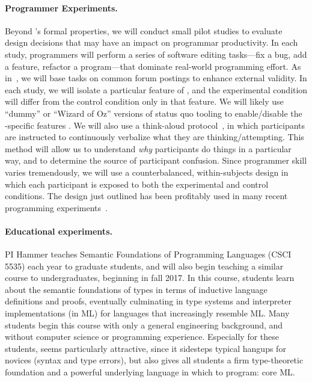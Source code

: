\paragraph{Programmer Experiments.} 
%
Beyond \Hazel's formal properties, we will conduct small pilot studies to
evaluate design decisions that may have an impact on programmar productivity. 
%
In each study, programmers will perform a series of software editing 
tasks---fix a bug, add a feature, refactor a program---that dominate 
real-world programming effort. As in~\cite{sunshine14plaiddoc}, 
we will base tasks on common forum postings to enhance external validity. In 
each study, we will isolate a particular feature of \Hazel, and the experimental 
condition will differ from the control condition only in that feature. We will 
likely use ``dummy'' or ``Wizard of Oz''  versions of status quo tooling to 
enable/disable the \HazelEnv-specific features \cite{wizard-of-oz}. We will also use 
a think-aloud protocol~\cite{think-aloud-protocol}, in which participants are 
instructed to continuously verbalize what they are thinking/attempting. This 
method will allow us to understand \textit{why} participants do things in a 
particular way, and to determine the source of participant confusion. Since 
programmer skill varies tremendously, we will use a counterbalanced, 
within-subjects design in which each participant is exposed to both the 
experimental and control conditions. 
The design just outlined has been profitably used in many recent programming 
experiments~\cite{stylos-constructor-params, static-typing-apidoc, benefits-generic-types}.



\paragraph{Educational experiments.} 
%
PI Hammer teaches Semantic Foundations of Programming Languages (CSCI
5535) each year to graduate students, and will also begin teaching a
similar course to undergraduates, beginning in fall 2017.
%
In this course, students learn about the semantic foundations of types
in terms of inductive language definitions and proofs, eventually
culminating in type systems and interpreter implementations (in ML)
for languages that increasingly resemble ML.
%
Many students begin this course with only a general engineering
background, and without computer science or programming experience.
Especially for these students, \Hazel seems particularly attractive,
since it sidesteps typical hangups for novices (syntax and type
errors), but also gives all students a firm type-theoretic foundation
and a powerful underlying language in which to program: core ML.

